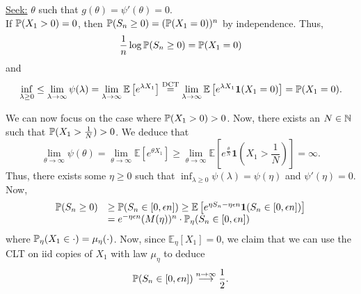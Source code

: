 \documentclass{article}
\begin{document}
\underline{Seek:} $ \theta$ such that $ g(\theta) = \psi'(\theta) = 0$.\\ 

If $ \mathbb{P}(X_{1}>0) = 0$, then $ \mathbb{P}(S_{n}\geq 0) = (\mathbb{P}(X_{1}=0))^{n}$ by independence. Thus, 
\[
\frac{1}{n}\log \mathbb{P}(S_{n}\geq 0) = \mathbb{P}(X_{1} = 0)
\]
and\[
\displaystyle\inf_{\lambda\geq 0} \leq \lim_{\lambda \to \infty}\psi(\lambda) = \lim_{\lambda \to \infty}\mathbb{E}\left[ e^{\lambda X_{1}} \right] \stackrel{\text{DCT}}{=} \lim_{\lambda \to \infty}\mathbb{E}\left[ e^{\lambda X_{1}} \mathbf{1}(X_{1}=0) \right] =  \mathbb{P}(X_{1}=0).
\]

We can now focus on the case where $ \mathbb{P}(X_{1}>0)>0$. Now, there exists an $ N\in \mathbb{N}$ such that $ \mathbb{P}(X_{1}>\frac{1}{N})>0$. We deduce that 
\[
	\lim_{\theta\to \infty}\psi(\theta) = \lim_{\theta \to \infty}\mathbb{E}\left[ e^{\theta X_{1}} \right] \geq \lim_{\theta \to \infty} \mathbb{E}\left[ e^{ \frac{\theta}{N}} \mathbf{1}\left(X_{1}>\frac{1}{N}\right)\right] = \infty. 
\]
Thus, there exists some $ \eta \geq 0$ such that $ \displaystyle\inf_{\lambda \geq 0}\psi(\lambda) = \psi(\eta)$ and $ \psi'(\eta) = 0$. Now, 
\[
\begin{array}{ll}
	\mathbb{P}(S_{n}\geq 0) &\geq \mathbb{P}(S_{n}\in [0, \epsilon n])\geq \mathbb{E}\left[ e^{\eta S_{n}-\eta\epsilon n} \mathbf{1}(S_{n}\in [0,\epsilon n]) \right] \\
			 & = e^{-\eta \epsilon n}(M(\eta))^{n}\cdot\mathbb{P}_{\eta}(S_{n}\in [0,\epsilon n])
\end{array}
\]
where $ \mathbb{P}_{\eta}(X_{1}\in \cdot) = \mu_{\eta}(\cdot)$. Now, since $ \mathbb{E}_{\eta}\left[ X_{1} \right] = 0$, we claim that we can use the CLT on iid copies of $ X_{1}$ with law $ \mu_{\eta}$ to deduce 
\[
	\mathbb{P}(S_{n}\in[0,\epsilon n])\stackrel{n\to \infty}{\longrightarrow}\frac{1}{2}.
\]
\end{document}
